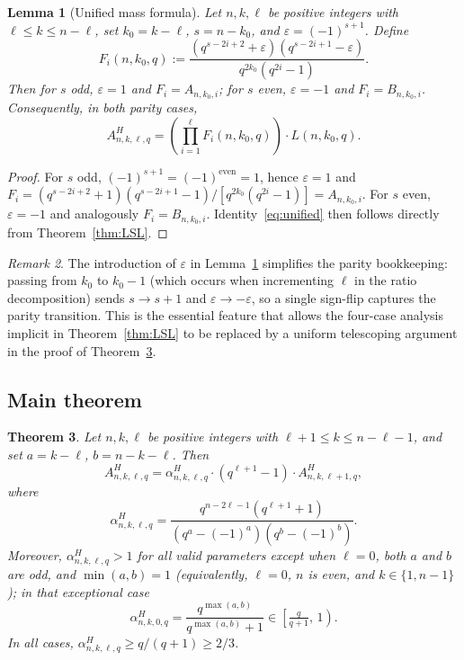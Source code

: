 \documentclass[11pt]{article}
\theoremstyle{plain}
\newtheorem{theorem}{Theorem}
\newtheorem{lemma}[theorem]{Lemma}
\theoremstyle{remark}
\newtheorem{remark}[theorem]{Remark}
\begin{document}
\begin{lemma}[Unified mass formula]\label{lem:unified}
Let $n, k, \ell$ be positive integers with $\ell \leq k \leq n - \ell$, set
$k_0 = k - \ell$, $s = n - k_0$, and $\varepsilon = (-1)^{s+1}$. Define
\begin{equation}\label{eq:Fi}
  F_i(n, k_0, q) := \frac{(q^{s-2i+2} + \varepsilon)(q^{s-2i+1} - \varepsilon)}{q^{2k_0}(q^{2i}-1)}.
\end{equation}
Then for $s$ odd, $\varepsilon = 1$ and $F_i = A_{n,k_0,i}$; for $s$ even,
$\varepsilon = -1$ and $F_i = B_{n,k_0,i}$. Consequently, in both parity cases,
\begin{equation}\label{eq:unified}
  A^H_{n,k,\ell,q} = \left(\prod_{i=1}^{\ell} F_i(n,k_0,q)\right) \cdot L(n,k_0,q).
\end{equation}
\end{lemma}

\begin{proof}
For $s$ odd, $(-1)^{s+1} = (-1)^{\text{even}} = 1$, hence $\varepsilon = 1$ and
$F_i = (q^{s-2i+2}+1)(q^{s-2i+1}-1)/[q^{2k_0}(q^{2i}-1)] = A_{n,k_0,i}$.
For $s$ even, $\varepsilon = -1$ and analogously $F_i = B_{n,k_0,i}$.
Identity~\eqref{eq:unified} then follows directly from Theorem~\ref{thm:LSL}.
\end{proof}

\begin{remark}
The introduction of $\varepsilon$ in Lemma~\ref{lem:unified} simplifies the
parity bookkeeping: passing from $k_0$ to $k_0 - 1$ (which occurs when
incrementing $\ell$ in the ratio decomposition) sends $s \to s+1$ and
$\varepsilon \to -\varepsilon$, so a single sign-flip captures the parity
transition. This is the essential feature that allows the four-case analysis
implicit in Theorem~\ref{thm:LSL} to be replaced by a uniform telescoping
argument in the proof of Theorem~\ref{thm:main}.
\end{remark}

\subsection{Main theorem}\label{sec:Hmain}

\begin{theorem}\label{thm:main}
Let $n, k, \ell$ be positive integers with $\ell+1 \leq k \leq n-\ell-1$,
and set $a = k - \ell$, $b = n-k-\ell$. Then
\begin{equation}\label{eq:decomp}
  A^H_{n,k,\ell,q} = \alpha^H_{n,k,\ell,q}\cdot (q^{\ell+1}-1)\cdot A^H_{n,k,\ell+1,q},
\end{equation}
where
\begin{equation}\label{eq:alpha}
  \alpha^H_{n,k,\ell,q} = \frac{q^{n-2\ell-1}(q^{\ell+1}+1)}{(q^{a}-(-1)^{a})(q^{b}-(-1)^{b})}.
\end{equation}
Moreover, $\alpha^H_{n,k,\ell,q} > 1$ for all valid parameters \emph{except}
when $\ell = 0$, both $a$ and $b$ are odd, and $\min(a,b) = 1$
(equivalently, $\ell=0$, $n$ is even, and $k\in\{1, n-1\}$); in that exceptional case
\[
  \alpha^H_{n,k,0,q} = \frac{q^{\max(a,b)}}{q^{\max(a,b)}+1} \in \left[\tfrac{q}{q+1},\, 1\right).
\]
In all cases, $\alpha^H_{n,k,\ell,q} \geq q/(q+1) \geq 2/3$.
\end{theorem}
\end{document}
